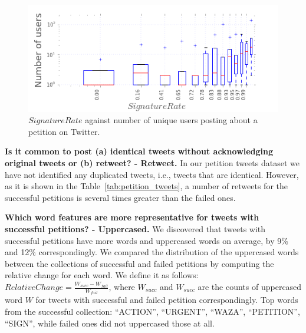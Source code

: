 \begin{figure}
\centering
\includegraphics[scale=0.45]{figures/signaturesgoalVSnumusersCampaigns.png}
\caption{$SignatureRate$ against number of unique users posting about a petition on Twitter.}
\label{fig:signatures_vs_users}
\end{figure}

\textbf{Is it common to post (a) identical tweets without acknowledging original tweets or (b) retweet? - Retweet.} In our petition tweets dataset we have not identified any duplicated tweets, i.e., tweets that are identical. However, as it is shown in the Table~\ref{tab:petition_tweets}, a number of retweets for the successful petitions is several times greater than the failed ones.

\textbf{Which word features are more representative for tweets with successful petitions? - Uppercased.} We discovered that tweets with successful petitions have more words and uppercased words on average, by 9\% and 12\% correspondingly. We compared the distribution of the uppercased words between the collections of successful and failed petitions by computing the relative change  for each word. We define it as follows: $RelativeChange = \frac{W_{succ} - W_{fail}}{W_{fail}}$, where $W_{succ}$ and $W_{succ}$ are the counts of uppercased word $W$ for tweets with successful and failed petition correspondingly. Top words from the successful collection: ``ACTION'', ``URGENT'', ``WAZA'', ``PETITION'', ``SIGN'', while failed ones did not uppercased those at all.
